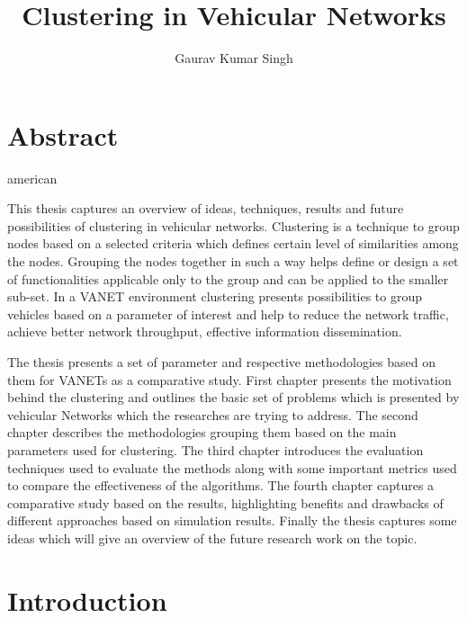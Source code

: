 \documentclass[]{ccs-thesis}
\author{Gaurav Kumar Singh}
\title{Clustering in Vehicular Networks}
\begin{document}

\maketitle

\chapter*{Abstract}
\begin{otherlanguage*}{american}

This thesis captures an overview of ideas, techniques, results and future possibilities of clustering in vehicular networks.
Clustering is a technique to group nodes based on a selected criteria which defines certain level of similarities among the nodes.
Grouping the nodes together in such a way helps define or design a set of functionalities applicable only to the
group and can be applied to the smaller sub-set. In a \ac{VANET} environment clustering presents possibilities
to group vehicles based on a parameter of interest and help to reduce the network traffic, achieve better network throughput,
effective information dissemination.

The thesis presents a set of parameter and respective methodologies based on them for \ac{VANET}s as a comparative study.
First chapter presents the motivation behind the clustering and outlines the basic set of problems which is presented by vehicular
Networks which the researches are trying to address. The second chapter describes the methodologies grouping them based on the main
parameters used for clustering. The third chapter introduces the evaluation techniques used to evaluate the methods along with some
important metrics used to compare the effectiveness of the algorithms. The fourth chapter captures a comparative study based on
the results, highlighting benefits and drawbacks of different approaches based on simulation results. Finally the thesis captures
some ideas which will give an overview of the future research work on the topic.
 
 
\end{otherlanguage*}


\acresetall

\cleardoublepage
\tableofcontents

\cleardoublepage
{}

\chapter{Introduction}
\label{sec:introduction}
\end{document}
